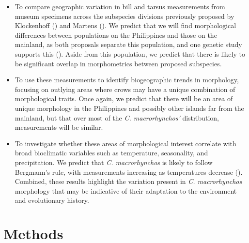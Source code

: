 \documentclass[10pt,a4paper]{article}
\begin{document}
\begin{itemize}
\item
  To compare geographic variation in bill and tarsus measurements from museum specimens across the subspecies divisions previously proposed by Klockenhoff () and Martens ().
  We predict that we will find morphological differences between populations on the Philippines and those on the mainland, as both proposals separate this population, and one genetic study supports this ().
  Aside from this population, we predict that there is likely to be significant overlap in morphometrics between proposed subspecies.
\item
  To use these measurements to identify biogeographic trends in morphology, focusing on outlying areas where crows may have a unique combination of morphological traits.
  Once again, we predict that there will be an area of unique morphology in the Philippines and possibly other islands far from the mainland, but that over most of the \emph{C. macrorhynchos'} distribution, measurements will be similar.
\item
  To investigate whether these areas of morphological interest correlate with broad bioclimatic variables such as temperature, seasonality, and precipitation.
  We predict that \emph{C. macrorhynchos} is likely to follow Bergmann's rule, with measurements increasing as temperatures decrease ().
  Combined, these results highlight the variation present in \emph{C. macrorhynchos} morphology that may be indicative of their adaptation to the environment and evolutionary history.
\end{itemize}

\section{Methods}\label{methods}
\end{document}
